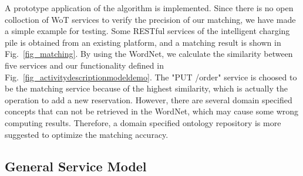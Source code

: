 A prototype application of the algorithm is implemented. Since there is no open colloction of WoT services to verify the precision of our matching, we have made a simple example for testing. Some RESTful services of the intelligent charging pile is obtained from an existing platform, and a matching result is shown in Fig.~\ref{fig_matching}. By using the WordNet, we calculate the similarity between five services and our functionality defined in Fig.~\ref{fig_activitydescriptionmodeldemo}. The "PUT /order" service is choosed to be the matching service because of the highest similarity, which is actually the operation to add a new reservation. However, there are several domain specified concepts that can not be retrieved in the WordNet, which may cause some wrong computing results. Therefore, a domain specified ontology repository is more suggested to optimize the matching accuracy. 

\subsection{General Service Model}



